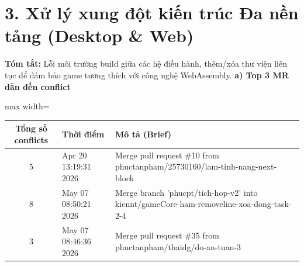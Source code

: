 \documentclass[12pt,a4paper]{article}
\begin{document}
\section*{3. Xử lý xung đột kiến trúc Đa nền tảng (Desktop \& Web)}
\textbf{Tóm tắt:} Lỗi môi trường build giữa các hệ điều hành, thêm/xóa thư viện liên tục để đảm bảo game tương thích với công nghệ WebAssembly.
\textbf{a) Top 3 MR dẫn đến conflict}
\begin{table}[H]
\centering
\renewcommand{\arraystretch}{1.3}
\begin{adjustbox}{max width=\textwidth}
\begin{tabular}{|c|l|p{8.5cm}|}
\hline
\rowcolor{orange!10}
\textbf{Tổng số conflicts} & \textbf{Thời điểm} & \textbf{Mô tả (Brief)} \\ \hline
5 & Apr 20 13:19:31 2026 & Merge pull request \#10 from phuctanpham/25730160/lam-tinh-nang-next-block \\ \hline
8 & May 07 08:50:21 2026 & Merge branch 'phucpt/tich-hop-v2' into kiennt/gameCore-ham-removeline-xoa-dong-task-2-4 \\ \hline
3 & May 07 08:46:36 2026 & Merge pull request \#35 from phuctanpham/thaidg/do-an-tuan-3 \\ \hline
\end{tabular}
\end{adjustbox}
\end{table}
\end{document}
